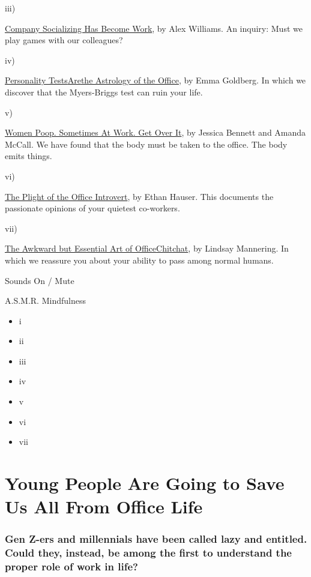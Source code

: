 iii)

\protect\hyperlink{elev3}{Company Socializing Has Become Work}, by Alex
Williams. An inquiry: Must we play games with our colleagues?

iv)

\protect\hyperlink{elev4}{Personality
Tests}\protect\hyperlink{elev4}{Are}\protect\hyperlink{elev4}{the
Astrology of the Office}, by Emma Goldberg. In which we discover that
the Myers-Briggs test can ruin your life.

v)

\protect\hyperlink{elev5}{Women Poop. Sometimes At Work. Get Over It},
by Jessica Bennett and Amanda McCall. We have found that the body must
be taken to the office. The body emits things.

vi)

\protect\hyperlink{elev6}{The Plight of the Office Introvert}, by Ethan
Hauser. This documents the passionate opinions of your quietest
co-workers.

vii)

\protect\hyperlink{elev7}{The Awkward but Essential Art of
Office}\protect\hyperlink{elev7}{Chitchat}, by Lindsay Mannering. In
which we reassure you about your ability to pass among normal humans.

Sounds On / Mute

A.S.M.R. Mindfulness

\begin{itemize}
\item
  i
\item
  ii
\item
  iii
\item
  iv
\item
  v
\item
  vi
\item
  vii
\end{itemize}

\href{https://www.nytimes3xbfgragh.onion/2019/09/17/style/generation-z-millennials-work-life-balance.html}{}

\hypertarget{young-people-are-going-to-save-us-all-from-office-life}{%
\section{Young People Are Going to Save Us All From Office
Life}\label{young-people-are-going-to-save-us-all-from-office-life}}

\hypertarget{gen-z-ers-and-millennials-have-been-called-lazy-and-entitled-could-they-instead-be-among-the-first-to-understand-the-proper-role-of-work-in-life}{%
\subsubsection{Gen Z-ers and millennials have been called lazy and
entitled. Could they, instead, be among the first to understand the
proper role of work in
life?}\label{gen-z-ers-and-millennials-have-been-called-lazy-and-entitled-could-they-instead-be-among-the-first-to-understand-the-proper-role-of-work-in-life}}

